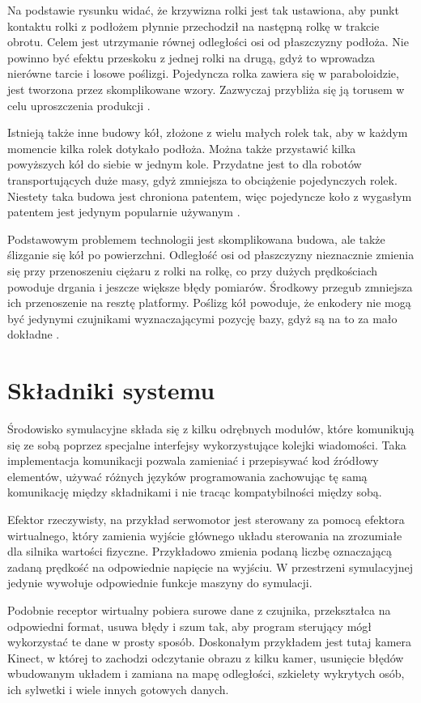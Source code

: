 Na podstawie rysunku widać, że krzywizna rolki jest tak ustawiona, aby punkt kontaktu rolki z podłożem płynnie przechodził na następną rolkę w trakcie obrotu.
Celem jest utrzymanie równej odległości osi od płaszczyzny podłoża.
Nie powinno być efektu przeskoku z jednej rolki na drugą, gdyż to wprowadza nierówne tarcie i losowe poślizgi.
Pojedyncza rolka zawiera się w paraboloidzie, jest tworzona przez skomplikowane wzory.
Zazwyczaj przybliża się ją torusem w celu uproszczenia produkcji \cite{rollers}.

Istnieją także inne budowy kół, złożone z wielu małych rolek tak, aby w każdym momencie kilka rolek dotykało podłoża.
Można także przystawić kilka powyższych kół do siebie w jednym kole.
Przydatne jest to dla robotów transportujących duże masy, gdyż zmniejsza to obciążenie pojedynczych rolek.
Niestety taka budowa jest chroniona patentem, więc pojedyncze koło z wygasłym patentem jest jedynym popularnie używanym \cite{paletobot}.

Podstawowym problemem technologii jest skomplikowana budowa, ale także ślizganie się kół po powierzchni.
Odległość osi od płaszczyzny nieznacznie zmienia się przy przenoszeniu ciężaru z rolki na rolkę, co przy dużych prędkościach powoduje drgania i jeszcze większe błędy pomiarów.
Środkowy przegub zmniejsza ich przenoszenie na resztę platformy.
Poślizg kół powoduje, że enkodery nie mogą być jedynymi czujnikami wyznaczającymi pozycję bazy, gdyż są na to za mało dokładne \cite{heavy}.

\section{Składniki systemu}
Środowisko symulacyjne składa się z kilku odrębnych modułów, które komunikują się ze sobą poprzez specjalne interfejsy wykorzystujące kolejki wiadomości.
Taka implementacja komunikacji pozwala zamieniać i przepisywać kod źródłowy elementów, używać różnych języków programowania zachowując tę samą komunikację między składnikami i nie tracąc kompatybilności między sobą.

Efektor rzeczywisty, na przykład serwomotor jest sterowany za pomocą efektora wirtualnego, który zamienia wyjście głównego układu sterowania na zrozumiałe dla silnika wartości fizyczne. 
Przykładowo zmienia podaną liczbę oznaczającą zadaną prędkość na odpowiednie napięcie na wyjściu. W przestrzeni symulacyjnej jedynie wywołuje odpowiednie funkcje maszyny do symulacji.

Podobnie receptor wirtualny pobiera surowe dane z czujnika, przekształca na odpowiedni format, usuwa błędy i szum tak, aby program sterujący mógł wykorzystać te dane w prosty sposób. 
Doskonałym przykładem jest tutaj kamera Kinect, w której to zachodzi odczytanie obrazu z kilku kamer, usunięcie błędów wbudowanym układem i zamiana na mapę odległości, szkielety wykrytych osób, ich sylwetki i wiele innych gotowych danych.

